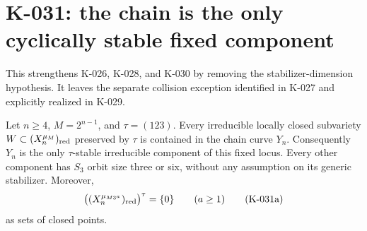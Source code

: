 \section{K-031: the chain is the only cyclically stable fixed component}

This strengthens K-026, K-028, and K-030 by removing the
stabilizer-dimension hypothesis.  It leaves the separate collision
exception identified in K-027 and explicitly realized in K-029.

\begin{theorem}[K-031a]
Let $n\ge4$, $M=2^{n-1}$, and $\tau=(123)$.  Every irreducible
locally closed subvariety $W\subset (X_n^{\mu_M})_{\rm red}$
preserved by $\tau$ is contained in the chain curve $Y_n$.
Consequently $Y_n$ is the only $\tau$-stable irreducible component
of this fixed locus.  Every other component has $S_3$ orbit size
three or six, without any assumption on its generic stabilizer.
Moreover,
\[
       \bigl((X_n^{\mu_{M3^a}})_{\rm red}\bigr)^{\tau}
                             =\{0\}\qquad(a\ge1)
                                                        \tag{K-031a}
\]
as sets of closed points.
\end{theorem}


